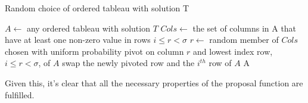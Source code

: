 \documentclass{article}
\begin{document}
\begin{algorithm}
\caption{Random choice of ordered tableau with solution T}
\label{unityProof}
\begin{algorithmic}
\State $A \leftarrow $ any ordered tableau with solution $T$
  \State $Cols \leftarrow$ the set of columns in A that have at least one non-zero value in rows $i \le r < \sigma$
  \State $r \leftarrow$ random member of $Cols$ chosen with uniform probability
  \State pivot on column $r$ and lowest index row, $i \le r < \sigma$, of $A$
  \State swap the newly pivoted row and the $i^{th}$ row of $A$
\EndFor
\State \Return A
\end{algorithmic}
\end{algorithm}

Given this, it's clear that all the necessary properties of the proposal function are fulfilled.

%
% 


\end{document}
